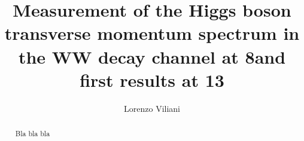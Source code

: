 \documentclass[draft,english,booktabs,hyperref,titling]{hepthesis}
\begin{document}
\begin{frontmatter}

\title{Measurement of the Higgs boson transverse momentum spectrum in the WW decay channel at 8\TeV and first results at 13\TeV}
\author{Lorenzo Viliani}


\begin{abstract}
Bla bla bla
\end{abstract}

\cleardoublepage
\pagestyle{fancy}
\fancyhead{}
\fancyfoot{}
\fancyhead[RO]{\thepage}
\fancyhead[LE]{\thepage}
\tableofcontents
\cleardoublepage

\end{frontmatter}

\begin{mainmatter}









\end{mainmatter}

\begin{backmatter}

\clearpage\thispagestyle{empty}\cleardoublepage
{}
\printbibliography
\clearpage\thispagestyle{empty}\cleardoublepage

\end{backmatter}
\end{document}
